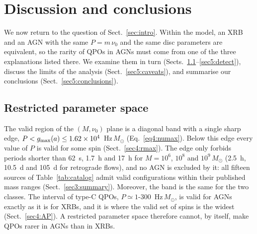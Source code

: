 \section{Discussion and conclusions}
\label{sec:discussion}

We now return to the question of Sect.~\ref{sec:intro}.
Within the model, an XRB and an AGN with the same $P=m\,\nu_0$ and the same disc parameters are equivalent, so the rarity of QPOs in AGNs must come from one of the three explanations listed there.
We examine them in turn (Sects.~\ref{sec5:space}--\ref{sec5:detect}), discuss the limits of the analysis (Sect.~\ref{sec5:caveats}), and summarise our conclusions (Sect.~\ref{sec5:conclusions}).

\subsection{Restricted parameter space}
\label{sec5:space}

The valid region of the $(M,\nu_0)$ plane is a diagonal band with a single sharp edge, $P<g_\textup{max}(a)\leq1.62\times10^4$~Hz\,$M_\odot$ (Eq.~\ref{eq4:numax}).
Below this edge every value of $P$ is valid for some spin (Sect.~\ref{sec4:rmax}).
The edge only forbids periods shorter than 62~s, 1.7~h and 17~h for $M=10^6$, $10^8$ and $10^9\,M_\odot$ (2.5~h, 10.5~d and 105~d for retrograde flows), and no AGN is excluded by it: all fifteen sources of Table~\ref{tab:catalog} admit valid configurations within their published mass ranges (Sect.~\ref{sec3:summary}).
Moreover, the band is the same for the two classes.
The interval of type-C QPOs, $P\simeq1$-$300$~Hz\,$M_\odot$, is valid for AGNs exactly as it is for XRBs, and it is where the valid set of spins is the widest (Sect.~\ref{sec4:AP}).
A restricted parameter space therefore cannot, by itself, make QPOs rarer in AGNs than in XRBs.

